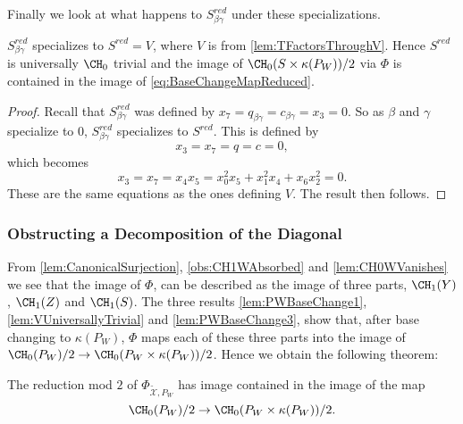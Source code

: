 Finally we look at what happens to $S_{\beta \gamma}^{red}$ under these specializations.
\begin{lemma}
  \label{lem:PWBaseChange3}
  $S^{red}_{\beta \gamma}$ specializes to $S^{red} = V$, where $V$ is from \cref{lem:TFactorsThroughV}. Hence $S^{red}$ is universally $\CH_0$ trivial and the image of
 $\CH_0(S \times \kappa(P_W))/2$ via $\Phi$ is contained in the image of \eqref{eq:BaseChangeMapReduced}.
\end{lemma}
\begin{proof}
   Recall that $S_{\beta \gamma}^{red}$ was defined by $x_7 = q_{\beta \gamma} = c_{\beta \gamma} = x_3 = 0$. So as $\beta$ and $\gamma$ specialize to 0, $S^{red}_{\beta \gamma}$ specializes to $S^{red}$. This is defined by
\[x_3 = x_7 = q = c = 0,\]
which becomes 
\[ x_3 = x_7 = x_4x_5 = x_0^2x_5 + x_1^2x_4 + x_6x_2^2 = 0.\]
These are the same equations as the ones defining $V$. The result then follows.
\end{proof}

\subsubsection{Obstructing a Decomposition of the Diagonal}
From \cref{lem:CanonicalSurjection}, \cref{obs:CH1WAbsorbed} and \cref{lem:CH0WVanishes} we see that the image of $\Phi$, can be described as the image of three parts, $\CH_1(Y)$, $\CH_1(Z)$ and $\CH_1(S)$. The three results \cref{lem:PWBaseChange1}, \cref{lem:VUniversallyTrivial} and \cref{lem:PWBaseChange3}, show that, after base changing to $\kappa(P_W)$, $\Phi$ maps each of these three parts into the image of $\CH_0(P_W)/2 \to \CH_0(P_W \times \kappa(P_W))/2$. Hence we obtain the following theorem:
\begin{lemma}
  \label{lem:ImageOfPhiContained}
  The reduction mod $2$ of $\Phi_{\widetilde{\mathcal{X}},P_W}$ has image contained in the image of the map
  \begin{equation}
    \label{eq:PWBaseChangeMap4}
    \CH_0(P_W)/2 \to \CH_0(P_W \times \kappa(P_W))/2.
  \end{equation}
\end{lemma}

